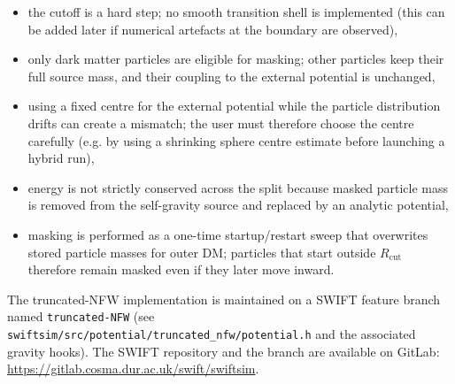 \begin{itemize}
\item the cutoff is a hard step; no smooth transition shell is implemented (this can be added later if numerical artefacts at the boundary are observed),
\item only dark matter particles are eligible for masking; other particles keep their full source mass, and their coupling to the external potential is unchanged,
\item using a fixed centre for the external potential while the particle distribution drifts can create a mismatch; the user must therefore choose the centre carefully (e.g. by using a shrinking sphere centre estimate before launching a hybrid run),
\item energy is not strictly conserved across the split because masked particle mass is removed from the self-gravity source and replaced by an analytic potential,
\item masking is performed as a one-time startup/restart sweep that overwrites stored particle masses for outer DM; particles that start outside $R_{\mathrm{cut}}$ therefore remain masked even if they later move inward.
\end{itemize}

The truncated-NFW implementation is maintained on a SWIFT feature branch named \texttt{truncated-NFW} (see \texttt{swiftsim/src/potential/truncated\_nfw/potential.h} and the associated gravity hooks). The SWIFT repository and the branch are available on GitLab: \url{https://gitlab.cosma.dur.ac.uk/swift/swiftsim}.